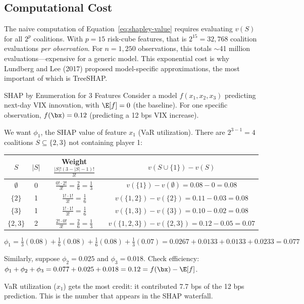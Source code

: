 \subsection{Computational Cost}

The naive computation of Equation~\eqref{eq:shapley-value} requires evaluating $v(S)$ for all $2^p$ coalitions.
With $p = 15$ risk-cube features, that is $2^{15} = 32{,}768$ coalition evaluations \emph{per observation}.
For $n = 1{,}250$ observations, this totals $\sim$41 million evaluations---expensive for a generic model.
This exponential cost is why Lundberg and Lee (2017) proposed model-specific approximations, the most important of which is TreeSHAP.

\begin{workedexample}{SHAP by Enumeration for 3 Features}
Consider a model $f(x_1, x_2, x_3)$ predicting next-day VIX innovation, with $\E[f] = 0$ (the baseline).
For one specific observation, $f(\bx) = 0.12$ (predicting a 12 bps VIX increase).

We want $\phi_1$, the SHAP value of feature $x_1$ (VaR utilization).
There are $2^{3-1} = 4$ coalitions $S \subseteq \{2, 3\}$ not containing player 1:

\begin{center}
\begin{tabular}{cccc}
\toprule
$S$ & $|S|$ & Weight $\frac{|S|!(3-|S|-1)!}{3!}$ & $v(S \cup \{1\}) - v(S)$ \\
\midrule
$\emptyset$    & 0 & $\frac{0! \cdot 2!}{3!} = \frac{2}{6} = \frac{1}{3}$ & $v(\{1\}) - v(\emptyset) = 0.08 - 0 = 0.08$ \\[4pt]
$\{2\}$        & 1 & $\frac{1! \cdot 1!}{3!} = \frac{1}{6}$               & $v(\{1,2\}) - v(\{2\}) = 0.11 - 0.03 = 0.08$ \\[4pt]
$\{3\}$        & 1 & $\frac{1! \cdot 1!}{3!} = \frac{1}{6}$               & $v(\{1,3\}) - v(\{3\}) = 0.10 - 0.02 = 0.08$ \\[4pt]
$\{2,3\}$      & 2 & $\frac{2! \cdot 0!}{3!} = \frac{2}{6} = \frac{1}{3}$ & $v(\{1,2,3\}) - v(\{2,3\}) = 0.12 - 0.05 = 0.07$ \\
\bottomrule
\end{tabular}
\end{center}

\[
\phi_1 = \tfrac{1}{3}(0.08) + \tfrac{1}{6}(0.08) + \tfrac{1}{6}(0.08) + \tfrac{1}{3}(0.07) = 0.0267 + 0.0133 + 0.0133 + 0.0233 = 0.077
\]

Similarly, suppose $\phi_2 = 0.025$ and $\phi_3 = 0.018$.
Check efficiency: $\phi_1 + \phi_2 + \phi_3 = 0.077 + 0.025 + 0.018 = 0.12 = f(\bx) - \E[f]$. \checkmark

VaR utilization ($x_1$) gets the most credit: it contributed 7.7 bps of the 12 bps prediction.
This is the number that appears in the SHAP waterfall.
\end{workedexample}

